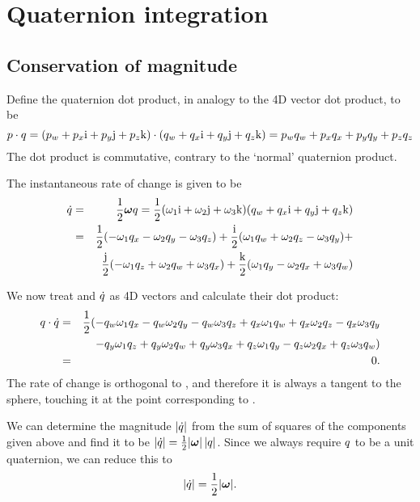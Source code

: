 \section{Quaternion integration\label{quatProofs}}
\subsection{Conservation of magnitude\label{quatIntegrationMagnitude}}
Define the quaternion dot product, in analogy to the 4D vector dot product, to be
\begin{equation}
p\cdot q =
    (p_w + p_x\mathrm{i} + p_y\mathrm{j} + p_z\mathrm{k})\cdot (q_w + q_x\mathrm{i} + q_y\mathrm{j} + q_z\mathrm{k}) =
    p_w q_w + p_x q_x + p_y q_y + p_z q_z
\end{equation}
The dot product is commutative, contrary to the `normal' quaternion product.

The instantaneous rate of change is given to be
\begin{eqnarray*}
\dot{\q{q}} & = & \frac{1}{2}\ve{\omega}\q{q} =
    \frac{1}{2}(\omega_1\qi + \omega_2\qj + \omega_3\qk)
    (q_w + q_x\qi + q_y\qj + q_z\qk) \\*
& = & \frac{1}{2} ( - \omega_1 q_x - \omega_2 q_y - \omega_3 q_z ) +
    \frac{\qi}{2} ( \omega_1 q_w + \omega_2 q_z - \omega_3 q_y ) + \\*
&&  \frac{\qj}{2} (-\omega_1 q_z + \omega_2 q_w + \omega_3 q_x ) +
    \frac{\qk}{2} ( \omega_1 q_y - \omega_2 q_x + \omega_3 q_w )
\end{eqnarray*}

We now treat  and $\dot{q}$ as 4D vectors and calculate
their dot product:
\begin{eqnarray*}
q\cdot\dot{q} & = & \frac{1}{2} (
    - q_w \omega_1 q_x - q_w \omega_2 q_y - q_w \omega_3 q_z
    + q_x \omega_1 q_w + q_x \omega_2 q_z - q_x \omega_3 q_y \\*
&&  - q_y \omega_1 q_z + q_y \omega_2 q_w + q_y \omega_3 q_x
    + q_z \omega_1 q_y - q_z \omega_2 q_x + q_z \omega_3 q_w ) \\*
& = & 0.
\end{eqnarray*}
The rate of change is orthogonal to , and therefore it is always
a tangent to the sphere, touching it at the point corresponding to .

We can determine the magnitude $|\dot{q}|$ from the sum of squares of the
components given above and find it to be
$\norm{\dot{\q{q}}} = \frac{1}{2}\norm{\ve{\omega}}\,\norm{\q{q}}$. Since we always
require $q$ to be a unit quaternion, we can reduce this to
\begin{equation}
\label{quatRateOfChangeMagnitude}
\norm{\dot{\q{q}}} = \frac{1}{2}\norm{\ve{\omega}}.
\end{equation}

